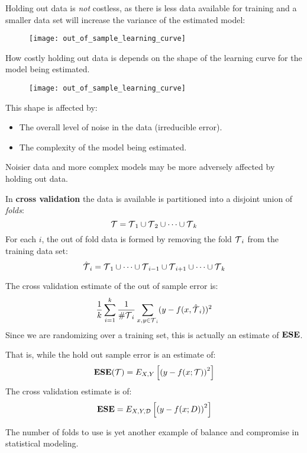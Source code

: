 %
%
\begin{frame}
  Holding out data is \textit{not} costless, as there is less data available for
  training and a smaller data set will increase the variance of the estimated
  model:
  \begin{figure}
    \texttt{[image: out\_of\_sample\_learning\_curve]}
  \end{figure}
  How costly holding out data is depends on the shape of the learning curve for
  the model being estimated.
\end{frame}
%
%
\begin{frame}
  \begin{figure}
    \texttt{[image: out\_of\_sample\_learning\_curve]}
  \end{figure}
  This shape is affected by:
  \begin{itemize}
    \item The overall level of noise in the data (irreducible error).
    \item The complexity of the model being estimated.
  \end{itemize}
  Noisier data and more complex models may be more adversely affected by holding
  out data.
\end{frame}
%
%
\begin{frame}
  In \textbf{cross validation} the data is available is partitioned into a
  disjoint union of \textit{folds}:
  $$ {\operatorname*{\mathcal{T}}} = {\operatorname*{\mathcal{T}}}_1 \cup {\operatorname*{\mathcal{T}}}_2 \cup \cdots \cup {\operatorname*{\mathcal{T}}}_k $$
  For each $i$, the out of fold data is formed by removing the fold ${\operatorname*{\mathcal{T}}}_i$ from
  the training data set:
  $$ \hat{{\operatorname*{\mathcal{T}}}}_i = {\operatorname*{\mathcal{T}}}_1 \cup \cdots \cup {\operatorname*{\mathcal{T}}}_{i-1} \cup {\operatorname*{\mathcal{T}}}_{i+1}
  \cup \cdots \cup {\operatorname*{\mathcal{T}}}_k $$
\end{frame}
%
%
\begin{frame}
  The cross validation estimate of the out of sample error is:
   $$ \frac{1}{k} \sum_{i=1}^{k} \frac{1}{\# {\operatorname*{\mathcal{T}}}_i } \sum_{x,y \in
   {\operatorname*{\mathcal{T}}}_i} (y - f(x, \hat{{\operatorname*{\mathcal{T}}}}_i))^2$$ 
   Since we are randomizing over a training set, this is actually an estimate of
   $\operatorname*{\mathbf{ESE}}$.
\end{frame}
%
%
\begin{frame}
  That is, while the hold out sample error is an estimate of:
  $$\operatorname*{\mathbf{ESE}}(\operatorname*{\mathcal{T}}) = E_{X,Y} \left[ \left( y - f(x; \operatorname*{\mathcal{T}}) \right)^2 \right]$$
  The cross validation estimate is of:
  $$\operatorname*{\mathbf{ESE}} = E_{X,Y,\operatorname*{\mathcal{D}}} \left[ \left( y - f(x; D) \right)^2 \right]$$
\end{frame}
%
%
\begin{frame}
  The number of folds to use is yet another example of balance and compromise in
  statistical modeling.
\end{frame}
